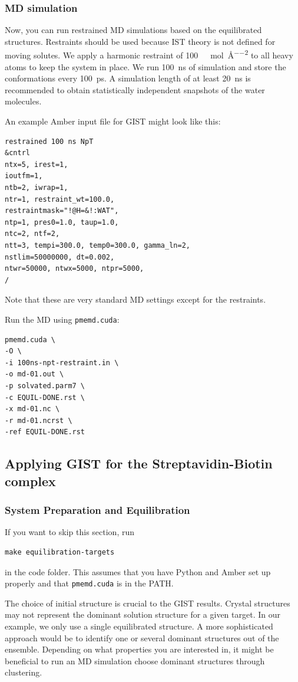 \documentclass[9pt,tutorial]{livecoms}
\newcommand{\software}{\texttt}
\begin{document}
\subsubsection{MD simulation}
Now, you can run restrained MD simulations based on the equilibrated structures.
Restraints should be used because IST theory is not defined for moving solutes.
We apply a harmonic restraint of \SI{100}{\kilo\calorie\per\mole\per\angstrom\squared} to all heavy atoms to keep the system in place.
We run \SI{100}{\nano\second} of simulation and store the conformations every \SI{100}{\pico\second}.
A simulation length of at least \SI{20}{\nano\second} is recommended to obtain statistically independent snapshots of the water molecules.

An example Amber input file for GIST might look like this:
\begin{lstlisting}[style=amber-in]
restrained 100 ns NpT
&cntrl
ntx=5, irest=1,
ioutfm=1,
ntb=2, iwrap=1,
ntr=1, restraint_wt=100.0,
restraintmask="!@H=&!:WAT",
ntp=1, pres0=1.0, taup=1.0,
ntc=2, ntf=2,
ntt=3, tempi=300.0, temp0=300.0, gamma_ln=2,
nstlim=50000000, dt=0.002,
ntwr=50000, ntwx=5000, ntpr=5000,
/
\end{lstlisting}
Note that these are very standard MD settings except for the restraints.

Run the MD using \software{pmemd.cuda}:
\begin{lstlisting}[style=bash]
pmemd.cuda \
-O \
-i 100ns-npt-restraint.in \
-o md-01.out \
-p solvated.parm7 \
-c EQUIL-DONE.rst \
-x md-01.nc \
-r md-01.ncrst \
-ref EQUIL-DONE.rst
\end{lstlisting}

\subsection{Applying GIST for the Streptavidin-Biotin complex}
\subsubsection{System Preparation and Equilibration}
If you want to skip this section, run 
\begin{lstlisting}[style=bash]
make equilibration-targets
\end{lstlisting}
in the code folder. This assumes that you have Python and Amber set up properly and that \software{pmemd.cuda} is in the PATH.

The choice of initial structure is crucial to the GIST results.
Crystal structures may not represent the dominant solution structure for a given target.
In our example, we only use a single equilibrated structure.
A more sophisticated approach would be to identify one or several dominant structures out of the ensemble.
Depending on what properties you are interested in, it might be beneficial to run an MD simulation choose dominant structures through clustering.
\end{document}
